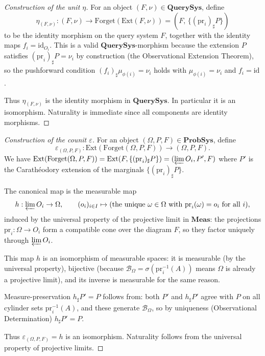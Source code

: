\documentclass[11pt]{article}
\newcommand{\Meas}{\mathbf{Meas}}
\newcommand{\QSys}{\mathbf{QuerySys}}
\newcommand{\PSys}{\mathbf{ProbSys}}
\newcommand{\Bcal}{\mathcal{B}}
\newcommand{\id}{\mathrm{id}}
\newcommand{\pr}{\mathrm{pr}}
\newcommand{\Ext}{\mathrm{Ext}}
\newcommand{\Forget}{\mathrm{Forget}}
\newcommand{\varlim}{\varprojlim}
\newcommand{\sharppush}{_\sharp}
\begin{document}
\begin{proof}[Construction of the unit $\eta$]
For an object $(F, \nu) \in \QSys$, define
\[
  \eta_{(F,\nu)} : (F, \nu) \to \Forget(\Ext(F, \nu))
  = \left(F,\, \{(\pr_i)\sharppush P\}\right)
\]
to be the identity morphism on the query system $F$, together with the
identity maps $f_i = \id_{O_i}$.  This is a valid $\QSys$-morphism because
the extension $P$ satisfies $(\pr_i)\sharppush P = \nu_i$ by construction
(the Observational Extension Theorem), so the pushforward condition
$(f_i)\sharppush \mu_{\phi(i)} = \nu_i$ holds with $\mu_{\phi(i)} = \nu_i$
and $f_i = \id$.

Thus $\eta_{(F,\nu)}$ is the identity morphism in $\QSys$.  In particular
it is an isomorphism.  Naturality is immediate since all components are
identity morphisms.
\end{proof}

\begin{proof}[Construction of the counit $\varepsilon$]
For an object $(\Omega, P, F) \in \PSys$, define
\[
  \varepsilon_{(\Omega, P, F)} :
  \Ext(\Forget(\Omega, P, F)) \to (\Omega, P, F).
\]
We have $\Ext(\Forget(\Omega, P, F)) = \Ext(F, \{(\pr_i)\sharppush P\})
= (\varlim O_i, P', F)$ where $P'$ is the Carathéodory extension of the
marginals $\{(\pr_i)\sharppush P\}$.

The canonical map is the measurable map
\[
  h : \varlim O_i \to \Omega, \qquad
  (o_i)_{i \in I} \mapsto \text{(the unique } \omega \in \Omega
  \text{ with } \pr_i(\omega) = o_i \text{ for all } i\text{)},
\]
induced by the universal property of the projective limit in $\Meas$:
the projections $\pr_i : \Omega \to O_i$ form a compatible cone over the
diagram $F$, so they factor uniquely through $\varlim O_i$.

This map $h$ is an isomorphism of measurable spaces: it is measurable
(by the universal property), bijective (because $\Bcal_\Omega = \sigma(\pr_i^{-1}(A))$
means $\Omega$ is already a projective limit), and its inverse is measurable
for the same reason.

Measure-preservation $h\sharppush P' = P$ follows from:
both $P'$ and $h\sharppush P'$ agree with $P$ on all cylinder sets
$\pr_i^{-1}(A)$, and these generate $\Bcal_\Omega$, so by uniqueness
(Observational Determination) $h\sharppush P' = P$.

Thus $\varepsilon_{(\Omega,P,F)} = h$ is an isomorphism.  Naturality
follows from the universal property of projective limits.
\end{proof}
\end{document}
